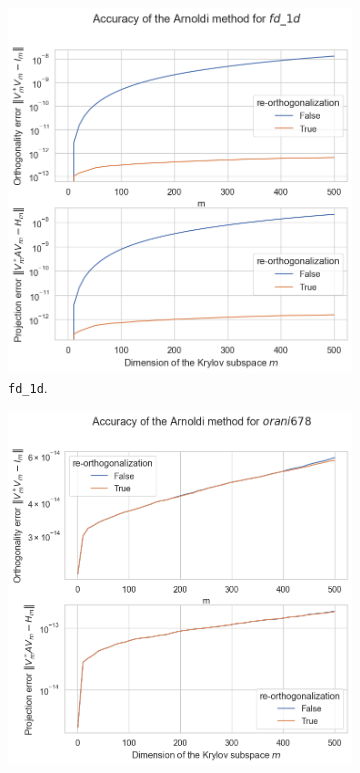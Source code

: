 \begin{figure}[h!]
    \centering
    \begin{subfigure}[b]{0.45\textwidth}
        \includegraphics[width=\textwidth]{img/arnoldi/fd_1d.png}
        \caption{\texttt{fd\_1d}.}
    \end{subfigure}
    \hfill
    \begin{subfigure}[b]{0.45\textwidth}
        \includegraphics[width=\textwidth]{img/arnoldi/orani678.png}

\end{subfigure}
\end{figure}
